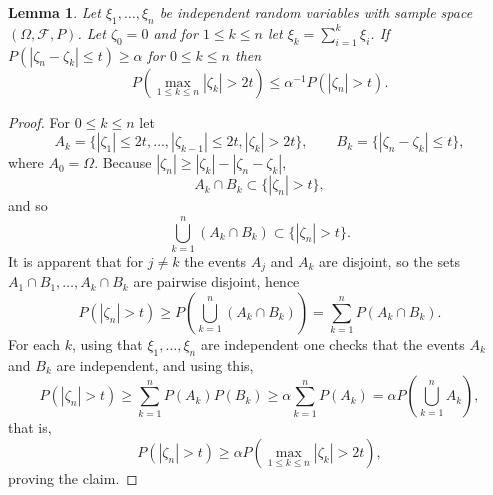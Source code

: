\documentclass{article}
\newtheorem{lemma}[theorem]{Lemma}
\theoremstyle{definition}
\begin{document}
\begin{lemma}
Let $\xi_1,\ldots,\xi_n$ be independent random variables with sample space $(\Omega,\mathscr{F},P)$. 
Let $\zeta_0=0$ and for $1 \leq k \leq n$ let $\xi_k = \sum_{i=1}^k \xi_i$. If $P(|\zeta_n-\zeta_k| \leq t) \geq \alpha$ for
$0 \leq k \leq n$ then
\[
P\left( \max_{1 \leq k \leq n} |\zeta_k| > 2t\right) \leq \alpha^{-1} P(|\zeta_n| > t).
\]
\label{Pmax}
\end{lemma}
\begin{proof}
For $0 \leq k \leq n$ let
\[
A_k = \{|\zeta_1| \leq 2t, \ldots, |\zeta_{k-1}| \leq 2t, |\zeta_k| > 2t\},
\qquad B_k = \{|\zeta_n-\zeta_k| \leq t\},
\]
where $A_0 = \Omega$.
Because $|\zeta_n| \geq |\zeta_k| - |\zeta_n-\zeta_k|$,
\[
A_k \cap B_k \subset \{ |\zeta_n| > t\},
\]
and so
\[
\bigcup_{k=1}^n (A_k \cap B_k) \subset  \{ |\zeta_n| > t\}.
\]
It is apparent that for $j \neq k$ the events $A_j$ and $A_k$ are disjoint, so the sets
$A_1 \cap B_1, \ldots, A_k \cap B_k$ are pairwise disjoint, hence
\[
P(  |\zeta_n| > t) \geq P\left( \bigcup_{k=1}^n (A_k \cap B_k) \right)
=\sum_{k=1}^n P(A_k \cap B_k).
\]
For each $k$, using that $\xi_1,\ldots,\xi_n$ are independent one checks that the events
$A_k$ and $B_k$ are independent, and using this,
\[
P(  |\zeta_n| > t)  \geq \sum_{k=1}^n P(A_k) P(B_k) \geq \alpha \sum_{k=1}^n P(A_k)
=\alpha P \left( \bigcup_{k=1}^n A_k \right),
\]
that is,
\[
P(|\zeta_n| > t) \geq \alpha P\left( \max_{1 \leq k \leq n} |\zeta_k| > 2t\right),
\]
proving the claim.
\end{proof}
\end{document}
